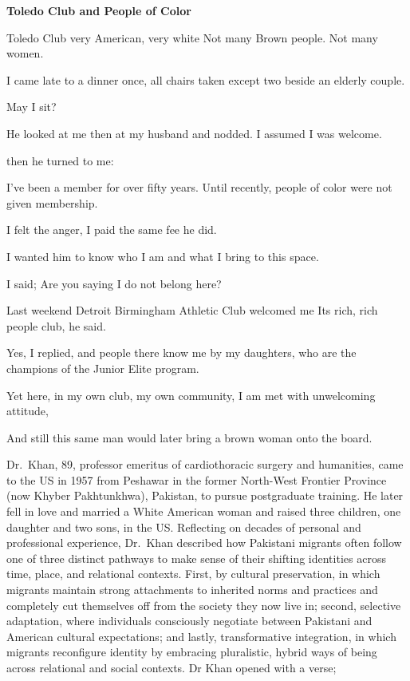 \textbf{Toledo Club and People of Color}

\begin{FoundPoem}
Toledo Club 
very American,
very white 
Not many Brown people.
Not many women.

I came late to a dinner once,
all chairs taken
except two
beside an elderly couple.

May I sit?

He looked at me
then at my husband
and nodded.
I assumed
I was welcome.

then he turned to me:

I’ve been a member
for over fifty years.
Until recently,
people of color
were not given membership.

I felt the anger, 
I paid the same fee
he did.

I wanted him to know
who I am
and what I bring
to this space.

I said; Are you saying I do not belong here?

Last weekend 
Detroit Birmingham Athletic Club welcomed me
Its rich, rich people club, he said.

Yes, I replied,
and people there
know me by my daughters, 
who are the champions of the Junior Elite program.

Yet here,
in my own club,
my own community,
I am met with unwelcoming attitude,

And still
this same man
would later bring
a brown woman
onto the board.
\end{FoundPoem}

Dr.~Khan, 89, professor emeritus of cardiothoracic surgery and humanities, came to the US in 1957 from Peshawar in the former North-West Frontier Province (now Khyber Pakhtunkhwa), Pakistan, to pursue postgraduate training. He later fell in love and married a White American woman and raised three children, one daughter and two sons, in the US. Reflecting on decades of personal and professional experience, Dr.~Khan described how Pakistani migrants often follow one of three distinct pathways to make sense of their shifting identities across time, place, and relational contexts. First, by cultural preservation, in which migrants maintain strong attachments to inherited norms and practices and completely cut themselves off from the society they now live in; second, selective adaptation, where individuals consciously negotiate between Pakistani and American cultural expectations; and lastly, transformative integration, in which migrants reconfigure identity by embracing pluralistic, hybrid ways of being across relational and social contexts. Dr Khan opened with a verse;

